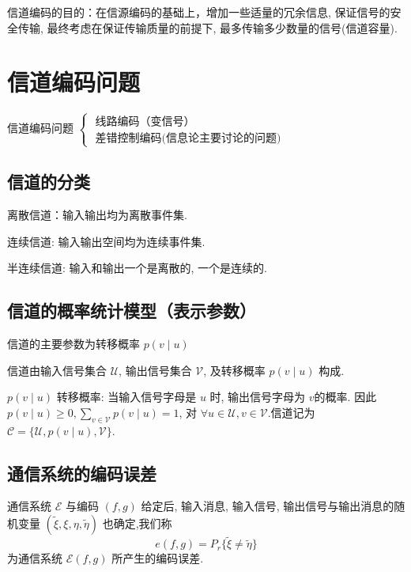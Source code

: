 
信道编码的目的：在信源编码的基础上，增加一些适量的冗余信息, 保证信号的安全传输, 最终考虑在保证传输质量的前提下, 最多传输多少数量的信号(信道容量).

\section{信道编码问题}
信道编码问题 $ \left\{\begin{array}{l}\text { 线路编码（变信号） } \\ \text { 差错控制编码(信息论主要讨论的问题) }\end{array}\right. $

\subsection*{信道的分类}
离散信道：输入输出均为离散事件集.

连续信道: 输入输出空间均为连续事件集.

半连续信道: 输入和输出一个是离散的, 一个是连续的.

\subsection*{信道的概率统计模型（表示参数）}
信道的主要参数为转移概率 $ p(v \mid u) $

信道由输入信号集合 $ \mathscr{U} $, 输出信号集合 $ \mathscr{V} $, 及转移概率 $ p(v \mid u) $ 构成.

\begin{remark}
     $ p(v \mid u) $ 转移概率: 当输入信号字母是 $ u $ 时, 输出信号字母为 $ v $的概率. 因此 $ p(v \mid u) \geq 0, \sum\limits_{v \in \mathscr{V}} p(v \mid u)=1 $, 对 $ \forall u \in \mathscr{U}, v \in \mathscr{V} $.信道记为 $ \mathscr{C}=\{\mathscr{U}, p(v \mid u), \mathscr{V}\} $.
\end{remark}


\subsection{通信系统的编码误差}

通信系统 $ \mathscr{E} $ 与编码 $ (f, g) $ 给定后, 输入消息, 输入信号, 输出信号与输出消息的随机变量 $ (\widetilde{\xi}, \xi, \eta, \widetilde{\eta}) $ 也确定,我们称 $$ e(f, g)=P_{r}\{\widetilde{\xi} \neq \widetilde{\eta}\} $$ 为通信系统 $ \mathscr{E}(f, g) $ 所产生的编码误差.

